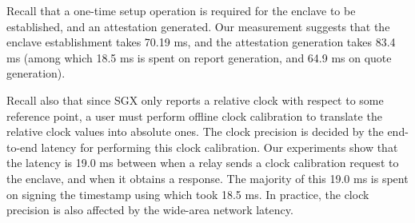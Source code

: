 Recall that a one-time setup operation is required 
for the enclave to be established, and an attestation generated. 
Our measurement suggests that the enclave establishment takes
70.19 ms, 
and the attestation generation takes 
83.4 ms (among which 
18.5 ms is spent 
on report generation, 
and 64.9 ms on quote generation).

Recall also that since SGX only reports a relative clock
with respect to some reference point,  
a user must perform offline clock calibration 
to translate the  relative clock values into absolute ones.
The clock precision is decided
by the end-to-end latency for performing 
this clock calibration. 
Our experiments show that the latency is 
19.0 ms 
between when a relay sends a clock calibration request
to the enclave, and when it obtains a response.
The majority of this 19.0 ms is spent on
signing the timestamp using \pkTC
which took 
18.5 ms.
In practice, the clock precision is also affected
by the wide-area network latency.

%
%
%
%
%

